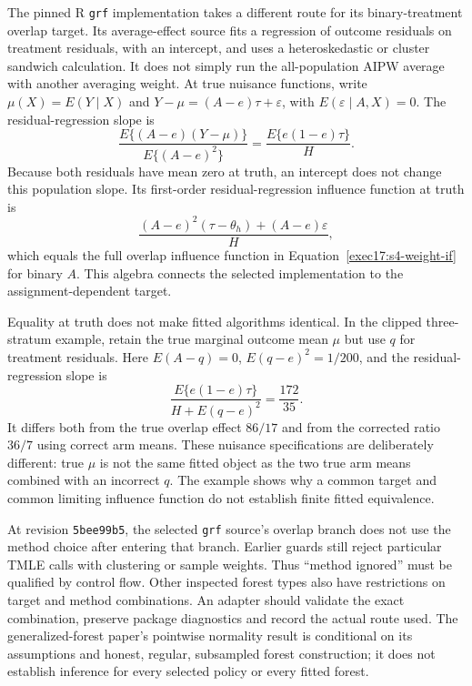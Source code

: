 The pinned R \texttt{grf} implementation takes a different route for its
binary-treatment overlap target. Its average-effect source fits a regression
of outcome residuals on treatment residuals, with an intercept, and uses a
heteroskedastic or cluster sandwich calculation. It does not simply run the
all-population AIPW average with another averaging weight. At true nuisance
functions, write $\mu(X)=E(Y\mid X)$ and
$Y-\mu=(A-e)\tau+\varepsilon$, with $E(\varepsilon\mid A,X)=0$.
The residual-regression slope is
\[
 \frac{E\{(A-e)(Y-\mu)\}}{E\{(A-e)^2\}}
       =\frac{E\{e(1-e)\tau\}}{H}.
\]
Because both residuals have mean zero at truth, an intercept does not change
this population slope. Its first-order residual-regression influence function
at truth is
\[
 \frac{(A-e)^2(\tau-\theta_h)+(A-e)\varepsilon}{H},
\]
which equals the full overlap influence function in
Equation~\eqref{exec17:s4-weight-if} for binary $A$.
This algebra connects the selected implementation to the assignment-dependent
target.\citep{exec13_grf_rpath,exec17_s4_math}

Equality at truth does not make fitted algorithms identical. In the clipped
three-stratum example, retain the true marginal outcome mean $\mu$ but use
$q$ for treatment residuals. Here $E(A-q)=0$,
$E(q-e)^2=1/200$, and the residual-regression slope is
\[
 \frac{E\{e(1-e)\tau\}}{H+E(q-e)^2}=\frac{172}{35}.
\]
It differs both from the true overlap effect $86/17$ and from the corrected
ratio $36/7$ using correct arm means. These nuisance specifications are
deliberately different: true $\mu$ is not the same fitted object as the two
true arm means combined with an incorrect $q$. The example shows why a
common target and common limiting influence function do not establish
finite fitted equivalence.\citep{exec17_s4_math}

At revision \texttt{5bee99b5}, the selected \texttt{grf} source's overlap branch
does not use the method choice after entering that branch. Earlier guards
still reject particular TMLE calls with clustering or sample weights. Thus
``method ignored'' must be qualified by control flow. Other inspected forest
types also have restrictions on target and method combinations. An adapter
should validate the exact combination, preserve package diagnostics and
record the actual route used. The generalized-forest paper's pointwise
normality result is conditional on its assumptions and honest, regular,
subsampled forest construction; it does not establish inference for every
selected policy or every fitted forest.\citep{exec13_grf_rpath,exec13_grf_native,grf2018}

